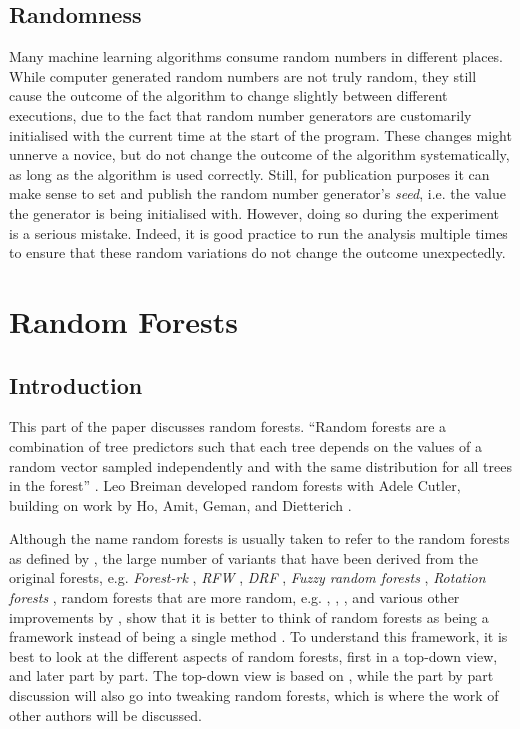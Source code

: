 \documentclass[a4paper,man,12pt,apacite,floatsintext,draftfirst]{apa6} %
\begin{document}
\subsection{Randomness}
Many machine learning algorithms consume random numbers in different places.
While computer generated random numbers are not truly random, they still
cause the outcome of the algorithm to change slightly between different
executions, due to the fact that random number generators are customarily
initialised with the current time at the start of the program.
These changes might unnerve a novice, but do not change the outcome of the
algorithm systematically, as long as the algorithm is used correctly.
Still, for publication purposes it can make sense to set and publish the
random number generator's \emph{seed}, i.e. the value the generator is being
initialised with.
However, doing so during the experiment
is a serious mistake.
Indeed, it is good practice to run the analysis multiple times to ensure
that these random variations do not change the outcome unexpectedly.

\newpage
\section{Random Forests}

\subsection{Introduction}
This part of the paper discusses random forests.
“Random forests are a combination of tree predictors such that each tree
depends on the values of a random vector sampled independently and with
the same distribution for all trees in the forest” \cite{breiman2001random}.
Leo Breiman developed random forests with Adele Cutler, building on work
by Ho, Amit, Geman, and Dietterich \cite{wpRF}.

Although the name random forests is usually taken to refer to the random
forests as defined by , the large number of
variants that have been derived from the original forests, e.g.
\emph{Forest-rk} \cite{bernard2008forest}, \emph{RFW} \cite{maudes2012random},
\emph{DRF} \cite{bernard2012dynamic}, \emph{Fuzzy random forests} \cite{bonissone2008fuzzy},
\emph{Rotation forests} \cite{rodriguez2006rotation}, random forests that are
more random, e.g. , ,
, and various other improvements by
,
show that it
is better to think of random forests as being a framework instead of being
a single method \cite{wpRF}.
To understand this framework, it is best to look at the different aspects
of random forests, first in a top-down view, and later part by part.
The top-down view is based on ,
while the part by part discussion will also go into tweaking random forests,
which is where the work of other authors will be discussed.
\end{document}

